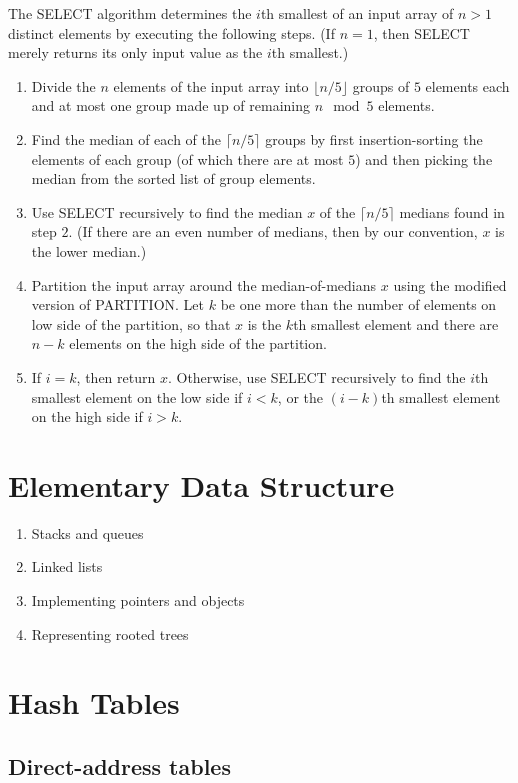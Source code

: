 \documentclass[12pt]{article}
\begin{document}
The SELECT algorithm determines the $i$th smallest of an input array of $n>1$ distinct elements by executing the following steps. (If $n = 1$, then SELECT merely returns its only input value as the $i$th smallest.)

\begin{enumerate}
  \item Divide the $n$ elements of the input array into $\lfloor n/5 \rfloor$ groups of $5$ elements each and at most one group made up of remaining $n \mod 5$ elements.
  \item Find the median of each of the $\lceil n/5 \rceil$ groups by first insertion-sorting the elements of each group (of which there are at most $5$) and then picking the median from the sorted list of group elements.
  \item Use SELECT recursively to find the median $x$ of the $\lceil n/5 \rceil$ medians found in step $2$. (If there are an even number of medians, then by our convention, $x$ is the lower median.)
  \item Partition the input array around the median-of-medians $x$ using the modified version of PARTITION. Let $k$ be one more than the number of elements on low side of the partition, so that $x$ is the $k$th smallest element and there are $n-k$ elements on the high side of the partition.
  \item If $i = k$, then return $x$. Otherwise, use SELECT recursively to find the $i$th smallest element on the low side if $i < k$, or the $(i-k)$th smallest element on the high side if $i>k$.
\end{enumerate}

\section{Elementary Data Structure}

\begin{enumerate}
  \item Stacks and queues
  \item Linked lists
  \item Implementing pointers and objects
  \item Representing rooted trees
\end{enumerate}

\section{Hash Tables}

\subsection{Direct-address tables}
\end{document}

